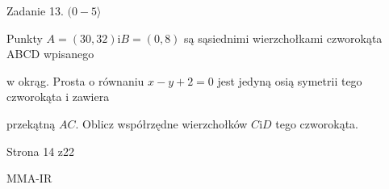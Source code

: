 \documentclass[a4paper,12pt]{article}
\begin{document}
Zadanie 13. $(0-5\rangle$

Punkty $A=(30,32) \mathrm{i} B=(0,8)$ są sąsiednimi wierzchołkami czworokąta ABCD wpisanego

w okrąg. Prosta o równaniu $x-y+2=0$ jest jedyną osią symetrii tego czworokąta i zawiera

przekątną $AC$. Oblicz współrzędne wierzchołków $C\mathrm{i}D$ tego czworokąta.

Strona 14 z22

MMA-IR
\end{document}

